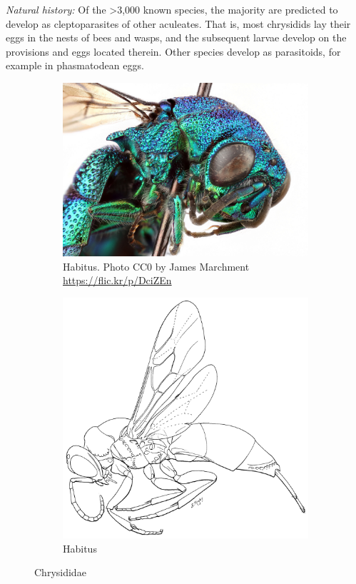 \documentclass[letterpaper, 11pt]{article}
\begin{document}
\noindent{}\textit{Natural history:} Of the \textgreater3,000 known species, the majority are predicted to develop as cleptoparasites of other aculeates. That is, most chrysidids lay their eggs in the nests of bees and wasps, and the subsequent larvae develop on the provisions and eggs located therein. Other species develop as parasitoids, for example in phasmatodean eggs. \\

\begin{figure}[ht!]
    \centering
    \begin{subfigure}[ht!]{0.42\textwidth}
        \includegraphics[width=\textwidth]{ChrysididColor}
        \caption{Habitus. Photo CC0 by James Marchment \url{https://flic.kr/p/DciZEn}}
        \label{fig:chrysid1}
    \end{subfigure}
    \qquad
    \begin{subfigure}[ht!]{0.39\textwidth}
        \includegraphics[width=\textwidth]{ChrysididHabitus}
        \caption{Habitus \citep[][Fig. 42]{goulet1993hymenoptera}}
        \label{fig:chrysid2}
    \end{subfigure}
    \caption{Chrysididae}\label{fig:chrysididae}
\end{figure}
\FloatBarrier 
\end{document}

